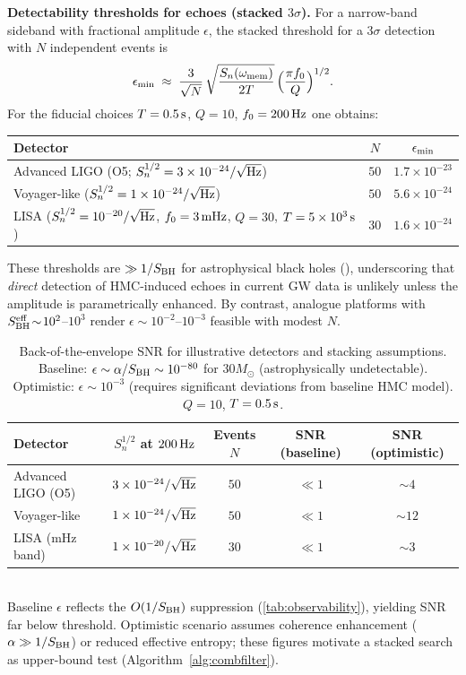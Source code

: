 \documentclass[a4paper,11pt]{article}
\newcommand{\HMC}{\textsc{HMC}\xspace}
\newenvironment{boxedresult}[1]{\begin{infobox}\noindent\textbf{#1.}}{\end{infobox}}
\theoremstyle{plain}
\theoremstyle{definition}
\theoremstyle{remark}
\begin{document}
\begin{boxedresult}{Detectability thresholds for echoes (stacked $3\sigma$)}
For a narrow-band sideband with fractional amplitude $\epsilon$, the stacked threshold for a $3\sigma$ detection with $N$ independent events is
\[
\epsilon_{\rm min} \;\approx\; \frac{3}{\sqrt{N}}\,
\sqrt{\frac{S_n(\omega_{\rm mem})}{2T}}\,
\Big(\frac{\pi f_0}{Q}\Big)^{1/2}.
\]
For the fiducial choices $T=0.5\,{\rm s}$, $Q=10$, $f_0=200\,{\rm Hz}$ one obtains:
\begin{center}
\begin{tabular}{lcc}
\toprule
Detector & $N$ & $\epsilon_{\rm min}$ \\
\midrule
Advanced LIGO (O5; $S_n^{1/2}=3\times 10^{-24}/\sqrt{\rm Hz}$) & $50$ & $1.7\times 10^{-23}$ \\
Voyager-like ($S_n^{1/2}=1\times 10^{-24}/\sqrt{\rm Hz}$) & $50$ & $5.6\times 10^{-24}$ \\
\midrule
LISA ($S_n^{1/2}=10^{-20}/\sqrt{\rm Hz}$, $f_0=3\,{\rm mHz}$, $Q=30$, $T=5\times 10^3\,{\rm s}$) & $30$ & $1.6\times 10^{-24}$ \\
\bottomrule
\end{tabular}
\end{center}
These thresholds are $\gg 1/S_{\rm BH}$ for astrophysical black holes (), underscoring that \emph{direct} detection of \HMC{}-induced echoes in current GW data is unlikely unless the amplitude is parametrically enhanced. 
By contrast, analogue platforms with $S_{\rm BH}^{\rm eff}\!\sim\!10^2$--$10^3$ render $\epsilon\sim 10^{-2}$--$10^{-3}$ feasible with modest $N$.
\end{boxedresult}

\begin{table}[t]
\centering
\caption{Back-of-the-envelope SNR for illustrative detectors and stacking assumptions. Baseline: $\epsilon\sim \alpha/S_{\rm BH}\sim 10^{-80}$ for $30M_\odot$ (astrophysically undetectable). Optimistic: $\epsilon\sim 10^{-3}$ (requires significant deviations from baseline \HMC{} model). $Q=10$, $T=0.5\,{\rm s}$.}
\label{tab:snr}
\begin{tabular}{lcccc}
\hline
Detector & $S_n^{1/2}$ at $200\,{\rm Hz}$ & Events $N$ & SNR (baseline) & SNR (optimistic) \\
\hline
Advanced LIGO (O5) & $3\times 10^{-24}/\sqrt{\rm Hz}$ & $50$ & $\ll 1$ & $\sim 4$ \\
Voyager-like & $1\times 10^{-24}/\sqrt{\rm Hz}$ & $50$ & $\ll 1$ & $\sim 12$ \\
LISA (mHz band) & $1\times 10^{-20}/\sqrt{\rm Hz}$ & $30$ & $\ll 1$ & $\sim 3$ \\
\hline
\end{tabular}
\\
\small Baseline $\epsilon$ reflects the $O(1/S_{\rm BH})$ suppression (\cref{tab:observability}), yielding SNR far below threshold. Optimistic scenario assumes coherence enhancement ($\alpha\gg 1/S_{\rm BH}$) or reduced effective entropy; these figures motivate a stacked search as upper-bound test (Algorithm~\ref{alg:combfilter}).
\end{table}
\end{document}
